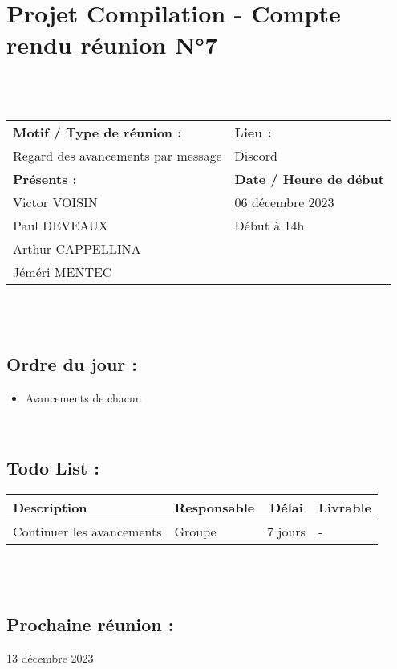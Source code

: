 \documentclass{article}
\begin{document}
\section*{Projet Compilation - Compte rendu réunion N°7}
~\\\\

\begin{tabular}{|p{7cm}|p{6cm}|}
    \hline
    \textbf{Motif / Type de réunion :}
    & \textbf{Lieu :}
    \\
    Regard des avancements par message
    &
    Discord
    \\ \hline
    \textbf{Présents :}
    &
    \textbf{Date / Heure de début}
    \\
    Victor VOISIN &  06 décembre 2023\\
    Paul DEVEAUX & Début à 14h\\
    Arthur CAPPELLINA & \\
    Jéméri MENTEC &
    \\ \hline
\end{tabular}
\\\\

\subsection*{Ordre du jour :}
\begin{itemize}
    \item{Avancements de chacun}
\end{itemize}
~

\subsection*{Todo List :}
\renewcommand{\arraystretch}{1.5}
\begin{tabular}{|p{5cm}|l|c|p{4.5cm}|}
    \hline
    Description & Responsable & Délai & Livrable\\ 
    \hline
     Continuer les avancements & Groupe & 7 jours & - \\
    \hline
\end{tabular}
\\\\

\subsection*{Prochaine réunion :} 13 décembre 2023
\end{document}
